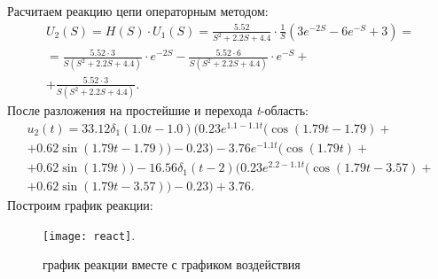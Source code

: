 \documentclass[a4paper,14pt ]{article} %
\begin{document}
    Расчитаем реакцию цепи операторным методом:
    \begin{multline}
        U_2(S) = H(S)\cdot U_1(S) =  \frac{5.52}{S^2 + 2.2S+ 4.4}
        \cdot \frac{1}{S}\left(3e^{-2S} - 6e^{-S} + 3\right) = \\
        = \frac{5.52\cdot3}{S(S^2 + 2.2S+ 4.4)}\cdot e^{-2S} -
        \frac{5.52\cdot6}{S(S^2 + 2.2S+ 4.4)}\cdot e^{-S} + \\
        + \frac{5.52\cdot3}{S(S^2 + 2.2S+ 4.4)}.
    \end{multline}
    После разложения на простейшие и перехода {\it t}-область:
    \begin{multline}
        u_2(t) = 33.12\delta_1(1.0t - 1.0)
        (0.23e^{1.1 - 1.1t}(\cos(1.79t - 1.79) + \\
        + 0.62\sin(1.79t - 1.79)) - 0.23) - 
        3.76e^{-1.1t}(\cos(1.79t) + \\
        + 0.62\sin(1.79t)) - 16.56\delta_1(t - 2)(0.23e^{2.2 - 1.1t}
        (\cos(1.79t - 3.57) + \\
        + 0.62\sin(1.79t - 3.57)) - 
        0.23) + 3.76.
    \end{multline}
    Построим график реакции:
    \begin{figure}[H]
        \texttt{[image: react]}.
        \centering
        \caption{график реакции вместе с графиком воздействия}
    \end{figure}
\end{document}
